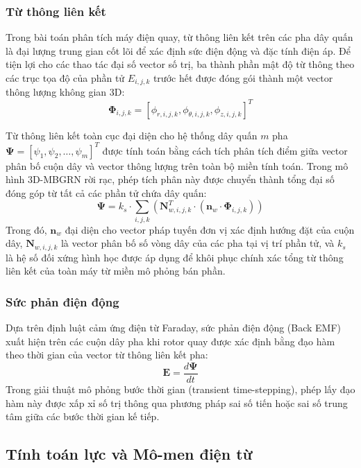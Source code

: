 \subsubsection{Từ thông liên kết}
Trong bài toán phân tích máy điện quay, từ thông liên kết trên các pha dây quấn là đại lượng trung gian cốt lõi để xác định sức điện động và đặc tính điện áp. Để tiện lợi cho các thao tác đại số vector số trị, ba thành phần mật độ từ thông theo các trục tọa độ của phần tử $E_{i,j,k}$ trước hết được đóng gói thành một vector thông lượng không gian 3D:
\begin{equation}
    \mathbf{\Phi}_{i,j,k} = [\phi_{r,i,j,k}, \phi_{\theta,i,j,k}, \phi_{z,i,j,k}]^T
\end{equation}

Từ thông liên kết toàn cục đại diện cho hệ thống dây quấn $m$ pha $\mathbf{\Psi} = [\psi_1, \psi_2, \dots, \psi_m]^T$ được tính toán bằng cách tích phân tích điểm giữa vector phân bố cuộn dây và vector thông lượng trên toàn bộ miền tính toán. Trong mô hình 3D-MBGRN rời rạc, phép tích phân này được chuyển thành tổng đại số đóng góp từ tất cả các phần tử chứa dây quấn:
\begin{equation}
    \mathbf{\Psi} = k_s \cdot \sum_{i,j,k} \left( \mathbf{N}_{w,i,j,k}^T \cdot (\mathbf{n}_w \cdot \mathbf{\Phi}_{i,j,k}) \right)
\end{equation}
Trong đó, $\mathbf{n}_w$ đại diện cho vector pháp tuyến đơn vị xác định hướng đặt của cuộn dây, $\mathbf{N}_{w,i,j,k}$ là vector phân bố số vòng dây của các pha tại vị trí phần tử, và $k_s$ là hệ số đối xứng hình học được áp dụng để khôi phục chính xác tổng từ thông liên kết của toàn máy từ miền mô phỏng bán phần.

\subsubsection{Sức phản điện động}
Dựa trên định luật cảm ứng điện từ Faraday, sức phản điện động (Back EMF) xuất hiện trên các cuộn dây pha khi rotor quay được xác định bằng đạo hàm theo thời gian của vector từ thông liên kết pha:
\begin{equation}
    \mathbf{E} = \frac{d\mathbf{\Psi}}{dt}
\end{equation}
Trong giải thuật mô phỏng bước thời gian (transient time-stepping), phép lấy đạo hàm này được xấp xỉ số trị thông qua phương pháp sai số tiến hoặc sai số trung tâm giữa các bước thời gian kế tiếp.

\subsection{Tính toán lực và Mô-men điện từ}

